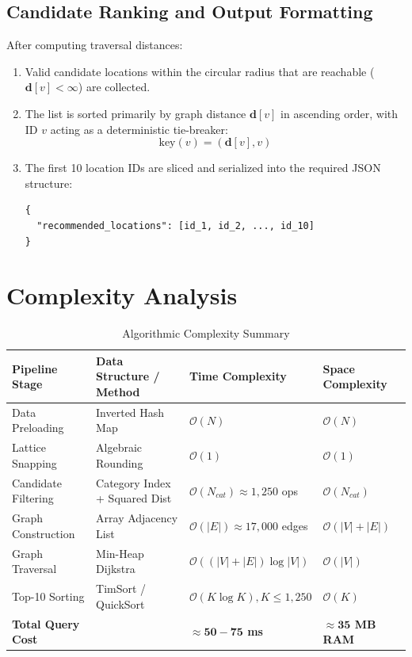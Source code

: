\documentclass[11pt,a4paper]{article}
\begin{document}
\subsection{Candidate Ranking and Output Formatting}
After computing traversal distances:
\begin{enumerate}
    \item Valid candidate locations within the circular radius that are reachable ($\mathbf{d}[v] < \infty$) are collected.
    \item The list is sorted primarily by graph distance $\mathbf{d}[v]$ in ascending order, with ID $v$ acting as a deterministic tie-breaker:
    \begin{equation}
        \text{key}(v) = (\mathbf{d}[v], v)
    \end{equation}
    \item The first 10 location IDs are sliced and serialized into the required JSON structure:
    \begin{lstlisting}[basicstyle=\ttfamily\footnotesize]
{
  "recommended_locations": [id_1, id_2, ..., id_10]
}
    \end{lstlisting}
\end{enumerate}

\section{Complexity Analysis}

\begin{table}[htbp]
\centering
\caption{Algorithmic Complexity Summary}
\begin{tabular}{@{}llll@{}}
\toprule
\textbf{Pipeline Stage} & \textbf{Data Structure / Method} & \textbf{Time Complexity} & \textbf{Space Complexity} \\ \midrule
Data Preloading & Inverted Hash Map & $\mathcal{O}(N)$ & $\mathcal{O}(N)$ \\
Lattice Snapping & Algebraic Rounding & $\mathcal{O}(1)$ & $\mathcal{O}(1)$ \\
Candidate Filtering & Category Index + Squared Dist & $\mathcal{O}(N_{cat}) \approx 1,250$ ops & $\mathcal{O}(N_{cat})$ \\
Graph Construction & Array Adjacency List & $\mathcal{O}(|E|) \approx 17,000$ edges & $\mathcal{O}(|V| + |E|)$ \\
Graph Traversal & Min-Heap Dijkstra & $\mathcal{O}((|V| + |E|) \log |V|)$ & $\mathcal{O}(|V|)$ \\
Top-10 Sorting & TimSort / QuickSort & $\mathcal{O}(K \log K), K \le 1,250$ & $\mathcal{O}(K)$ \\ \midrule
\textbf{Total Query Cost} & & \textbf{$\approx \mathbf{50 - 75}$ ms} & \textbf{$\approx \mathbf{35}$ MB RAM} \\ \bottomrule
\end{tabular}
\label{tab:complexity}
\end{table}
\end{document}
